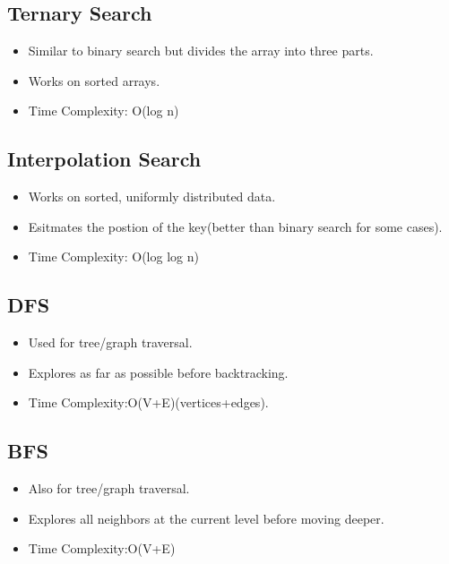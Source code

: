 \documentclass[12pt, letterpaper]{article}
\begin{document}
\subsection{Ternary Search}
\begin{itemize}
    \item Similar to binary search but divides the array into three parts.
    \item Works on sorted arrays.
    \item Time Complexity: O(log n)
\end{itemize}
\subsection{Interpolation Search}
\begin{itemize}
    \item Works on sorted, uniformly distributed data.
    \item Esitmates the postion of the key(better than binary search for some cases).
    \item Time Complexity: O(log log n)
\end{itemize}
\subsection{DFS}
\begin{itemize}
    \item Used for tree/graph traversal.
    \item Explores as far as possible before backtracking.
    \item Time Complexity:O(V+E)(vertices+edges).
\end{itemize}
\subsection{BFS}
\begin{itemize}
    \item Also for tree/graph traversal.
    \item Explores all neighbors at the current level before moving deeper.
    \item Time Complexity:O(V+E)
\end{itemize}
\end{document}
